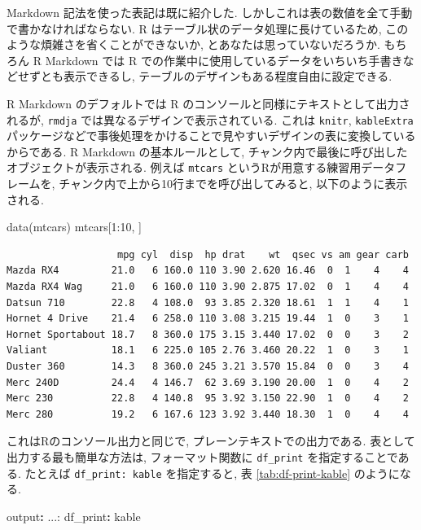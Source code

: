 \documentclass[
]{bxjsbook}
\newenvironment{Shaded}{\begin{snugshade}}{\end{snugshade}}
\newcommand{\AttributeTok}[1]{\textcolor[rgb]{0.77,0.63,0.00}{#1}}
\newcommand{\DecValTok}[1]{\textcolor[rgb]{0.00,0.00,0.81}{#1}}
\newcommand{\FunctionTok}[1]{\textcolor[rgb]{0.00,0.00,0.00}{#1}}
\newcommand{\KeywordTok}[1]{\textcolor[rgb]{0.13,0.29,0.53}{\textbf{#1}}}
\newcommand{\NormalTok}[1]{#1}
\newcommand{\SpecialCharTok}[1]{\textcolor[rgb]{0.00,0.00,0.00}{#1}}
\theoremstyle{definition}
\theoremstyle{definition}
\theoremstyle{definition}
\theoremstyle{remark}
\begin{document}
Markdown 記法を使った表記は既に紹介した.
しかしこれは表の数値を全て手動で書かなければならない. R
はテーブル状のデータ処理に長けているため,
このような煩雑さを省くことができないか, とあなたは思っていないだろうか.
もちろん R Markdown では R
での作業中に使用しているデータをいちいち手書きなどせずとも表示できるし,
テーブルのデザインもある程度自由に設定できる.

R Markdown のデフォルトでは R
のコンソールと同様にテキストとして出力されるが, \texttt{rmdja}
では異なるデザインで表示されている. これは \texttt{knitr},
\texttt{kableExtra}
パッケージなどで事後処理をかけることで見やすいデザインの表に変換しているからである.
R Markdown の基本ルールとして,
チャンク内で最後に呼び出したオブジェクトが表示される. 例えば
\texttt{mtcars} というRが用意する練習用データフレームを,
チャンク内で上から10行までを呼び出してみると, 以下のように表示される.

\begin{Shaded}
\begin{Highlighting}[numbers=left,,]
\FunctionTok{data}\NormalTok{(mtcars)}
\NormalTok{mtcars[}\DecValTok{1}\SpecialCharTok{:}\DecValTok{10}\NormalTok{, ]}
\end{Highlighting}
\end{Shaded}

\begin{verbatim}
                   mpg cyl  disp  hp drat    wt  qsec vs am gear carb
Mazda RX4         21.0   6 160.0 110 3.90 2.620 16.46  0  1    4    4
Mazda RX4 Wag     21.0   6 160.0 110 3.90 2.875 17.02  0  1    4    4
Datsun 710        22.8   4 108.0  93 3.85 2.320 18.61  1  1    4    1
Hornet 4 Drive    21.4   6 258.0 110 3.08 3.215 19.44  1  0    3    1
Hornet Sportabout 18.7   8 360.0 175 3.15 3.440 17.02  0  0    3    2
Valiant           18.1   6 225.0 105 2.76 3.460 20.22  1  0    3    1
Duster 360        14.3   8 360.0 245 3.21 3.570 15.84  0  0    3    4
Merc 240D         24.4   4 146.7  62 3.69 3.190 20.00  1  0    4    2
Merc 230          22.8   4 140.8  95 3.92 3.150 22.90  1  0    4    2
Merc 280          19.2   6 167.6 123 3.92 3.440 18.30  1  0    4    4
\end{verbatim}

これはRのコンソール出力と同じで, プレーンテキストでの出力である.
表として出力する最も簡単な方法は, フォーマット関数に \texttt{df\_print}
を指定することである. たとえば \texttt{df\_print:\ kable} を指定すると,
表 \ref{tab:df-print-kable} のようになる.

\begin{Shaded}
\begin{Highlighting}[]
\FunctionTok{output}\KeywordTok{:}\AttributeTok{ ...:}
\AttributeTok{  }\FunctionTok{df\_print}\KeywordTok{:}\AttributeTok{ kable}
\end{Highlighting}
\end{Shaded}
\end{document}
